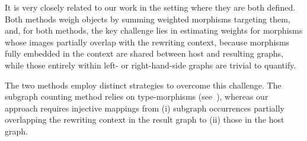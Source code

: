It is very closely related to our work in the setting where they are both defined. Both methods weigh objects by summing weighted morphisms targeting them, and, for both methods, the key challenge lies in estimating weights for morphisms whose images partially overlap with the rewriting context, because morphisms fully embedded in the context are shared between host and resulting graphs, while those entirely within left- or right-hand-side graphs are trivial to quantify.  

The two methods employ distinct strategies to overcome this challenge. The subgraph counting method relies on type-morphisms (see~\cite[page 9, remark 4.11, Lemma 4.23]{overbeek2024termination_lmcs}), whereas our approach requires injective mappings from (i) subgraph occurrences partially overlapping the rewriting context in the result graph to (ii) those in the host graph.

